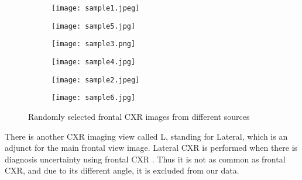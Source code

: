 \documentclass{article}
\begin{document}
\begin{figure}[H]
    \begin{subfigure}[b]{0.3\linewidth}
        \centering
        \texttt{[image: sample1.jpeg]}

        \label{fig:test1}
    \end{subfigure}
    \hfill
    \begin{subfigure}[b]{0.3\linewidth}
        \centering
        \texttt{[image: sample5.jpg]}

        \label{fig:test2}
    \end{subfigure}
    \hfill
    \begin{subfigure}[b]{0.3\linewidth}
        \centering
        \texttt{[image: sample3.png]}

        \label{fig:test3}
    \end{subfigure}
    \hfill
    \begin{subfigure}[b]{0.3\linewidth}
        \centering
        \texttt{[image: sample4.jpg]}

        \label{fig:test4}
    \end{subfigure}
    \hfill
    \begin{subfigure}[b]{0.3\linewidth}
        \centering
        \texttt{[image: sample2.jpeg]}

        \label{fig:test5}
    \end{subfigure}
        \hfill
    \begin{subfigure}[b]{0.3\linewidth}
        \centering
        \texttt{[image: sample6.jpg]}

        \label{fig:test5}
    \end{subfigure}
\caption{Randomly selected frontal CXR images from different sources}
\label{fig:normal_chest}
\end{figure}

\noindent There is another CXR imaging view called L, standing for Lateral, which is an adjunct for the main frontal view image. Lateral CXR is performed when there is diagnosis uncertainty using frontal CXR \cite{ittyachen2017forgotten}. Thus it is not as common as frontal CXR, and due to its different angle, it is excluded from our data. 
\end{document}
